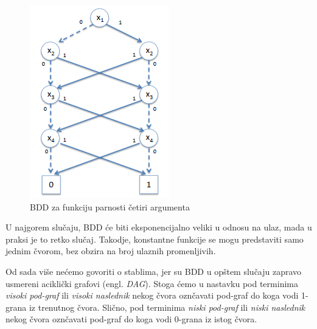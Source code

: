 \begin{figure}[H]
    \centering
    \includegraphics[scale=0.8]{slike/BDD_Parity.PNG}
    \caption{BDD za funkciju parnosti \v{c}etiri argumenta}
    \label{diag:BDDParity}
\end{figure}

U najgorem slu\v{c}aju, BDD \'c{}e biti eksponencijalno veliki u odnosu na ulaz, mada u praksi je to retko slu\v{c}aj. Takodje, konstantne funkcije se mogu predstaviti samo jednim \v{c}vorom, bez obzira na broj ulaznih promenljivih.

Od sada vi\v{s}e ne\'c{}emo govoriti o stablima, jer su BDD u op\v{s}tem slu\v{c}aju zapravo usmereni acikli\v{c}ki grafovi (engl. \emph{DAG}). Stoga \'c{}emo u nastavku pod terminima \emph{visoki pod-graf} ili \emph{visoki naslednik} nekog \v{c}vora ozn\v{c}avati pod-graf do koga vodi 1-grana iz trenutnog \v{c}vora. Sli\v{c}no, pod terminima \emph{niski pod-graf} ili \emph{niski naslednik} nekog \v{c}vora ozn\v{c}avati pod-graf do koga vodi 0-grana iz istog \v{c}vora.
